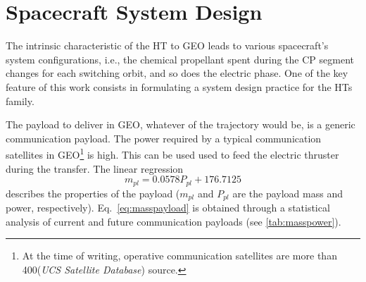 
\section{Spacecraft System Design}
\label{sec:spacecraftsystemdesign}
The intrinsic characteristic of the HT to GEO leads to various spacecraft's system configurations, i.e., the chemical propellant spent during the CP segment changes for each switching orbit, and so does the electric phase. One of the key feature of this work consists in formulating a system design practice for the HTs family.

The payload to deliver in GEO, whatever of the trajectory would be, is a generic communication payload. The power required by a typical communication satellites in GEO\footnote{At the time of writing, operative communication satellites are more than 400(\emph{UCS Satellite Database}) source.} is high. This can be used used to feed the electric thruster during the transfer. The linear regression
%
\begin{equation}
m_{\scriptstyle{{pl}}}= 0.0578 P{_{pl}} + 176.7125
\label{eq:masspayload}
\end{equation}
%
describes the properties of the payload ($m_{\scriptstyle{{pl}}}$ and $P{_{pl}}$ are the payload mass and power, respectively). Eq.\ \eqref{eq:masspayload} is obtained through a statistical analysis of current and future communication payloads (see \tablename\ref{tab:masspower}).
%
